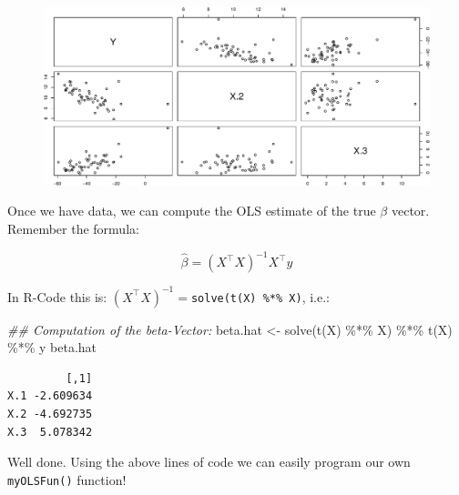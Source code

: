 \documentclass[
  letterpaper,
  DIV=11,
  numbers=noendperiod]{scrreprt}
\newenvironment{Shaded}{\begin{snugshade}}{\end{snugshade}}
\newcommand{\DocumentationTok}[1]{\textcolor[rgb]{0.37,0.37,0.37}{\textit{#1}}}
\newcommand{\FunctionTok}[1]{\textcolor[rgb]{0.28,0.35,0.67}{#1}}
\newcommand{\NormalTok}[1]{\textcolor[rgb]{0.00,0.23,0.31}{#1}}
\newcommand{\OtherTok}[1]{\textcolor[rgb]{0.00,0.23,0.31}{#1}}
\newcommand{\SpecialCharTok}[1]{\textcolor[rgb]{0.37,0.37,0.37}{#1}}
\theoremstyle{definition}
\theoremstyle{plain}
\theoremstyle{plain}
\theoremstyle{remark}
\begin{document}
\begin{figure}[H]

{\centering \includegraphics{./01-Introduction-to-R_files/figure-pdf/unnamed-chunk-29-1.pdf}

}

\end{figure}

\hfill\break

Once we have data, we can compute the OLS estimate of the true \(\beta\)
vector. Remember the formula:

\[\hat{\beta}=(X^\top X)^{-1}X^\top y\]

In R-Code this is: \((X^\top X)^{-1}=\)\texttt{solve(t(X)\ \%*\%\ X)},
i.e.:

\begin{Shaded}
\begin{Highlighting}[]
\DocumentationTok{\#\# Computation of the beta{-}Vector:}
\NormalTok{beta.hat }\OtherTok{\textless{}{-}} \FunctionTok{solve}\NormalTok{(}\FunctionTok{t}\NormalTok{(X) }\SpecialCharTok{\%*\%}\NormalTok{ X) }\SpecialCharTok{\%*\%} \FunctionTok{t}\NormalTok{(X) }\SpecialCharTok{\%*\%}\NormalTok{ y}
\NormalTok{beta.hat}
\end{Highlighting}
\end{Shaded}

\begin{verbatim}
         [,1]
X.1 -2.609634
X.2 -4.692735
X.3  5.078342
\end{verbatim}

\hfill\break

Well done. Using the above lines of code we can easily program our own
\texttt{myOLSFun()} function!
\end{document}
